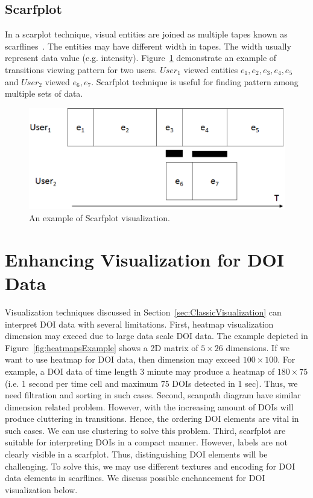 \subsection{Scarfplot}
In a scarplot technique, visual entities are joined as multiple tapes known as scarflines~\cite{richardson2005looking}. The entities may have different width in tapes. The width usually represent data value (e.g. intensity). Figure~\ref{fig:scarfplotExample} demonstrate an example of transitions viewing pattern for two users. $User_1$ viewed entities $e_1, e_2, e_3, e_4,e_5$ and $User_2$ viewed $e_6, e_7$. Scarfplot technique is useful for finding pattern among multiple sets of data. 
\begin{figure}[htbp]
  \centering
  \includegraphics[width=\linewidth]{images/ScarfplotExample.eps}
  \caption{An example of Scarfplot visualization. }
	\label{fig:scarfplotExample}
\end{figure}

\section{Enhancing Visualization for DOI Data}
Visualization techniques discussed in Section~\ref{sec:ClassicVisualization} can interpret DOI data with several limitations. First, heatmap visualization dimension may exceed due to large data scale DOI data. The example depicted in Figure~\ref{fig:heatmapsExample} shows a 2D matrix of $5 \times 26$ dimensions. If we want to use heatmap for DOI data, then dimension may exceed $100 \times 100$. For example, a DOI data of time length 3 minute may produce a heatmap of $180 \times 75$ (i.e. 1 second per time cell and maximum 75 DOIs detected in 1 sec). Thus, we need filtration and sorting in such cases. Second, scanpath diagram have similar dimension related problem. However, with the increasing amount of DOIs will produce cluttering in transitions. Hence, the ordering DOI elements are vital in such cases. We can use clustering to solve this problem. Third, scarfplot are suitable for interpreting DOIs in a compact manner. However, labels are not clearly visible in a scarfplot. Thus, distinguishing DOI elements will be challenging. To solve this, we may use different textures and encoding for DOI data elements in scarflines. We discuss possible enchancement for DOI visualization below. 

